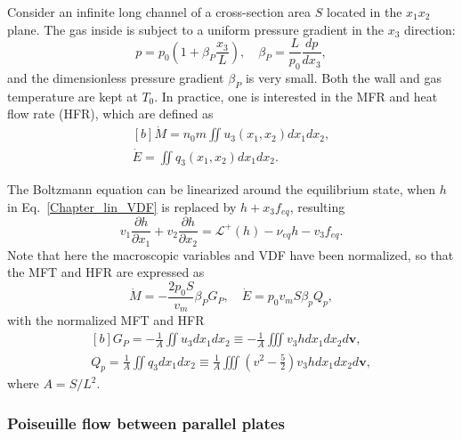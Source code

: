 Consider an infinite long channel of a cross-section area $S$ located in the $x_1x_2$ plane. The gas inside is subject to a uniform pressure gradient in the $x_3$ direction:
\begin{equation}
p=p_0\left(1+\beta_P{}\frac{x_3}{L}\right), \quad
\beta_P=\frac{L}{p_0}\frac{dp}{dx_3},
\end{equation}
and the dimensionless pressure gradient $\beta_P$ is very small. Both the wall and gas temperature are kept at $T_0$. In practice, one is interested in the MFR and heat flow rate (HFR), which are defined as
\begin{equation}\label{MFR_HFR}
\begin{aligned}[b]
\dot{M}=n_0m\iint {}u_3(x_1,x_2)dx_1dx_2,\\
\dot{E}=\iint       q_3(x_1,x_2)dx_1dx_2.
\end{aligned}
\end{equation}

The Boltzmann equation can be linearized around the equilibrium state, when $h$ in Eq.~\eqref{Chapter_lin_VDF} is replaced by $h+x_3f_{eq}$, resulting 
\begin{equation}\label{poiseuille_tube}
v_1\frac{\partial h}{\partial x_1}+v_2\frac{\partial h}{\partial x_2}=\mathcal{L}^+(h)-\nu_{eq}{h}-{v_3}f_{eq}.
\end{equation}
Note that here the macroscopic variables and VDF have been normalized, so that the MFT and HFR are expressed as
\begin{equation}\label{normalized_MFR}
\dot{M}=-\frac{2p_0S}{v_m}\beta_PG_P,\quad
\dot{E}=p_0v_mS\beta_p{}Q_p,
\end{equation}
with the normalized MFT and HFR
\begin{equation}
\begin{aligned}[b]
G_P=-\frac{1}{A}\iint {u_3}dx_1dx_2\equiv -\frac{1}{A}\iiint {v_3h}dx_1dx_2d\bm{v}, \\  
Q_p=\frac{1}{A}\iint {q_3}dx_1dx_2\equiv
\frac{1}{A}\iiint {\left({v}^2-\frac{5}{2}\right)v_3}hdx_1dx_2d\bm{v}, 
\end{aligned}
\end{equation}
where $A=S/L^2$. 




\subsubsection{Poiseuille flow between parallel plates}

